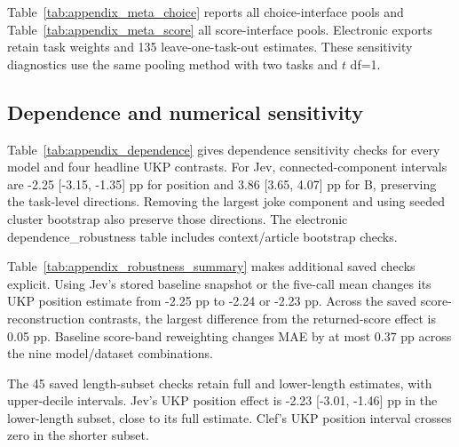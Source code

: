 Table~\ref{tab:appendix_meta_choice} reports all choice-interface pools and Table~\ref{tab:appendix_meta_score} all score-interface pools. Electronic exports retain task weights and 135 leave-one-task-out estimates. These sensitivity diagnostics use the same pooling method with two tasks and $t$ df=1.

\subsection{Dependence and numerical sensitivity}

\label{app:results_robustness}

Table~\ref{tab:appendix_dependence} gives dependence sensitivity checks for every model and four headline UKP contrasts. For Jev, connected-component intervals are -2.25 [-3.15, -1.35] pp for position and 3.86 [3.65, 4.07] pp for B, preserving the task-level directions. Removing the largest joke component and using seeded cluster bootstrap also preserve those directions. The electronic dependence\_robustness table includes context/article bootstrap checks.

Table~\ref{tab:appendix_robustness_summary} makes additional saved checks explicit. Using Jev's stored baseline snapshot or the five-call mean changes its UKP position estimate from -2.25 pp to -2.24 or -2.23 pp. Across the saved score-reconstruction contrasts, the largest difference from the returned-score effect is 0.05 pp. Baseline score-band reweighting changes MAE by at most 0.37 pp across the nine model/dataset combinations.

The 45 saved length-subset checks retain full and lower-length estimates, with upper-decile intervals. Jev's UKP position effect is -2.23 [-3.01, -1.46] pp in the lower-length subset, close to its full estimate. Clef's UKP position interval crosses zero in the shorter subset.

\clearpage

















